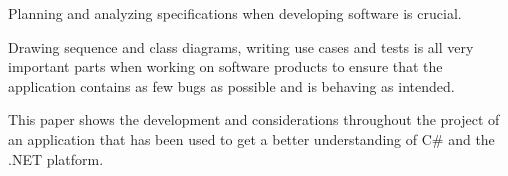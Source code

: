 \label{sec:abstract}
Planning and analyzing specifications when developing software is crucial.

Drawing sequence and class diagrams, writing use cases and tests is all very important parts when working on software products to ensure that the application contains as few bugs as possible and is behaving as intended.

This paper shows the development and considerations throughout the project of an application that has been used to get a better understanding of C\# and the .NET platform.